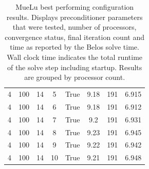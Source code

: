 \begin{table}[H]
{\begin{tabular}{cccccccc}
			4             & 100                             & 14                           & 5            & True             & 9.18                   & 191           & 6.915             \\
			4             & 100                             & 14                           & 6            & True             & 9.18                   & 191           & 6.912             \\
			4             & 100                             & 14                           & 7            & True             & 9.2                    & 191           & 6.931             \\
			4             & 100                             & 14                           & 8            & True             & 9.23                   & 191           & 6.945             \\
			4             & 100                             & 14                           & 9            & True             & 9.22                   & 191           & 6.942             \\
			4             & 100                             & 14                           & 10           & True             & 9.21                   & 191           & 6.948             \\
			\bottomrule
		\end{tabular}
	}%
	\caption{MueLu best performing configuration results. Displays preconditioner parameters that were tested, number of processors, convergence status, final iteration count and time as reported by the Belos solve time. Wall clock time indicates the total runtime of the solve step including startup. Results are grouped by processor count.}
	\label{tab:muelu_optimal}
\end{table}
